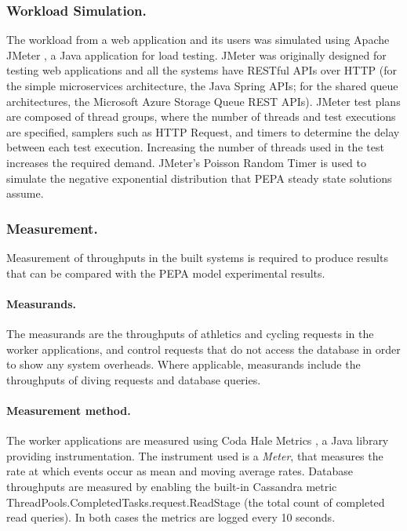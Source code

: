 \documentclass[runningheads]{llncs}
\begin{document}
\subsubsection{Workload Simulation.}  The workload from a web application and its users was simulated using Apache JMeter \cite{RN1074}, a Java application for load testing.  JMeter was originally designed for testing web applications and all the systems have RESTful APIs over HTTP (for the simple microservices architecture, the Java Spring APIs; for the shared queue architectures, the Microsoft Azure Storage Queue REST APIs).  JMeter test plans are composed of thread groups, where the number of threads and test executions are specified, samplers such as HTTP Request, and timers to determine the delay between each test execution.  Increasing the number of threads used in the test increases the required demand.  JMeter's Poisson Random Timer is used to simulate the negative exponential distribution \cite{RN80} that PEPA steady state solutions assume.

\subsubsection{Measurement.}  Measurement of throughputs in the built systems is required to produce results that can be compared with the PEPA model experimental results.

\paragraph{Measurands.} The measurands are the throughputs of athletics and cycling requests in the worker applications, and control requests that do not access the database in order to show any system overheads.  Where applicable, measurands include the throughputs of diving requests and database queries.

\paragraph{Measurement method.}  The worker applications are measured using Coda Hale Metrics \cite{RN1079}, a Java library providing instrumentation.  The instrument used is a {\itshape Meter}, that measures the rate at which events occur as mean and moving average rates.  Database throughputs are measured by enabling the built-in Cassandra metric ThreadPools.CompletedTasks.request.ReadStage (the total count of completed read queries).  In both cases the metrics are logged every 10 seconds.
\end{document}
